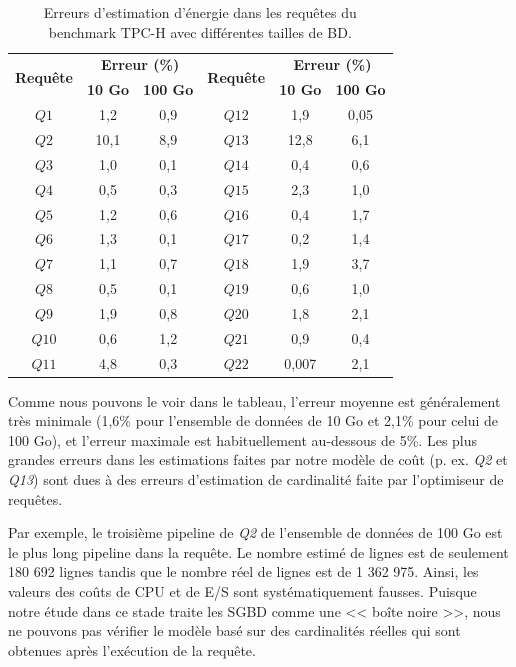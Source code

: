 \begin{table}[]
\centering
\caption {Erreurs d'estimation d'énergie dans les requêtes du benchmark TPC-H avec différentes tailles de BD.}\label{tab:tpch-results}
\begin{tabular}{cccccc}
\toprule
\multirow{2}{*}{\textbf{Requête}} & \multicolumn{2}{c}{\textbf{Erreur (\%)}} & \multirow{2}{*}{\textbf{Requête}} & \multicolumn{2}{c}{\textbf{Erreur (\%)}} \\ \cmidrule(lr){2-3} \cmidrule(l){5-6} 
    & \textbf{10 Go} & \textbf{100 Go} & & \textbf{10 Go} & \textbf{100 Go} \\ \midrule
	$Q1$ & 1,2 & 0,9 & $Q12$ & 1,9 & 0,05 \\ 
	$Q2$ & 10,1 & 8,9 & $Q13$ & 12,8 & 6,1 \\ 
	$Q3$ & 1,0 & 0,1 & $Q14$ & 0,4 & 0,6 \\ 
	$Q4$ & 0,5 & 0,3 & $Q15$ & 2,3 & 1,0 \\ 
	$Q5$ & 1,2 & 0,6 & $Q16$ & 0,4 & 1,7 \\ 
	$Q6$ & 1,3 & 0,1 & $Q17$ & 0,2 & 1,4 \\ 
	$Q7$ & 1,1 & 0,7 & $Q18$ & 1,9 & 3,7 \\ 
	$Q8$ & 0,5 & 0,1 & $Q19$ & 0,6 & 1,0 \\ 
	$Q9$ & 1,9 & 0,8 & $Q20$ & 1,8 & 2,1 \\ 
	$Q10$ & 0,6 & 1,2 & $Q21$ & 0,9 & 0,4 \\ 
	$Q11$ & 4,8 & 0,3 & $Q22$ & 0,007 & 2,1 \\ \bottomrule
\end{tabular}
\end{table}

Comme nous pouvons le voir dans le tableau, l'erreur moyenne est généralement très minimale (1,6\% pour l'ensemble de données de 10 Go et 2,1\% pour celui de 100 Go), et l'erreur maximale est habituellement au-dessous de 5\%. Les plus grandes erreurs dans les estimations faites par notre modèle de coût (p. ex. \textit{Q2} et \textit{Q13}) sont dues à des erreurs d'estimation de cardinalité faite par l'optimiseur de requêtes.

Par exemple, le troisième pipeline de \textit{Q2} de l'ensemble de données de 100 Go est le plus long pipeline dans la requête. Le nombre estimé de lignes est de seulement 180 692 lignes tandis que le nombre réel de lignes est de 1 362 975. Ainsi, les valeurs des coûts de CPU et de E/S sont systématiquement fausses. Puisque notre étude dans ce stade traite les SGBD comme une << boîte noire >>, nous ne pouvons pas vérifier le modèle basé sur des cardinalités réelles qui sont obtenues après l'exécution de la requête.

